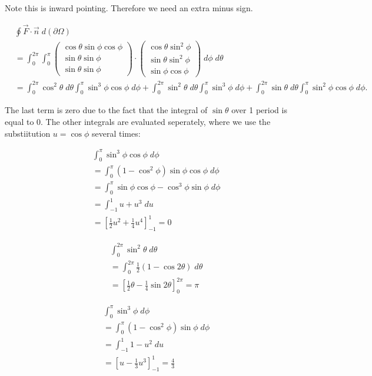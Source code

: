 \documentclass[11pt]{article}
\begin{document}
\begin{solution}
Note this is inward pointing. Therefore we need an extra minus sign.

    \begin{align*}
        &
        \oint \vec{F}\cdot \vec{n} \;d(\partial \Omega)
        \\&
        =
        \int_{0}^{2\pi}\int_0^{\pi} \begin{pmatrix}\cos\theta\sin\phi\cos\phi\\ \sin\theta\sin\phi \\ \sin\theta\sin\phi \end{pmatrix}\cdot\begin{pmatrix} \cos\theta\sin^2\phi\\ \sin\theta\sin^2\phi \\\sin\phi\cos\phi \end{pmatrix} \;d\phi\;d\theta
        \\&
        =
        \int_{0}^{2\pi}\cos^2\theta\;d\theta\int_0^{\pi}\sin^3\phi\cos\phi\;d\phi + \int_{0}^{2\pi}\sin^2\theta\;d\theta\int_0^{\pi}\sin^3\phi\;d\phi +  \int_{0}^{2\pi}\sin\theta\;d\theta\int_0^{\pi}\sin^2\phi\cos\phi\;d\phi
        .
    \end{align*}

The last term is zero due to the fact that the integral of $\sin\theta$ over 1 period is equal to $0$. The other integrals are evaluated seperately, where we use the substiitution $u = \cos\phi$ several times:

    \begin{align*}
        &
        \int_0^{\pi}\sin^3\phi\cos\phi\;d\phi 
        \\&
	  = \int_0^{\pi}(1 - \cos^2\phi)\sin\phi\cos\phi\;d\phi 
	  \\&
	  = \int_0^{\pi}\sin\phi\cos\phi - \cos^3\phi\sin\phi\;d\phi 	
	  \\&
	  = \int_{-1}^1 u + u^3 \;d u  
	  \\&
	  = \left[\frac{1}{2} u^2 +\frac{1}{4}u^4\right]_{-1}^{1} = 0
    \end{align*}

    \begin{align*}
        &
        \int_0^{2\pi}\sin^2\theta\;d\theta
        \\&
	  = \int_0^{2\pi}\frac{1}{2}(1-\cos2\theta)\;d\theta 
	  \\&
	  = \left[\frac{1}{2} \theta -\frac{1}{4}\sin2\theta\right]_{0}^{2\pi} = \pi
    \end{align*}

    \begin{align*}
        &
        \int_0^{\pi}\sin^3\phi\;d\phi 
        \\&
	  = \int_0^{\pi}(1 - \cos^2\phi)\sin\phi\;d\phi 
	  \\&
	  = \int_{-1}^1 1 - u^2 \;d u  
	  \\&
	  = \left[ u - \frac{1}{3}u^3\right]_{-1}^{1} = \frac{4}{3}
    \end{align*}
\end{solution}
\end{document}
